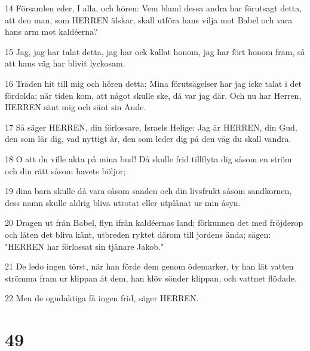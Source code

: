 \par 14 Församlen eder, I alla, och hören: Vem bland dessa andra har förutsagt detta, att den man, som HERREN älskar, skall utföra hans vilja mot Babel och vara hans arm mot kaldéerna?
\par 15 Jag, jag har talat detta, jag har ock kallat honom, jag har fört honom fram, så att hans väg har blivit lyckosam.
\par 16 Träden hit till mig och hören detta; Mina förutsägelser har jag icke talat i det fördolda; när tiden kom, att något skulle ske, då var jag där. Och nu har Herren, HERREN sänt mig och sänt sin Ande.
\par 17 Så säger HERREN, din förlossare, Israels Helige: Jag är HERREN, din Gud, den som lär dig, vad nyttigt är, den som leder dig på den väg du skall vandra.
\par 18 O att du ville akta på mina bud! Då skulle frid tillflyta dig såsom en ström och din rätt såsom havets böljor;
\par 19 dina barn skulle då vara såsom sanden och din livsfrukt såsom sandkornen, dess namn skulle aldrig bliva utrotat eller utplånat ur min åsyn.
\par 20 Dragen ut från Babel, flyn ifrån kaldéernas land; förkunnen det med fröjderop och låten det bliva känt, utbreden ryktet därom till jordens ända; sägen: "HERREN har förlossat sin tjänare Jakob."
\par 21 De ledo ingen törst, när han förde dem genom ödemarker, ty han lät vatten strömma fram ur klippan åt dem, han klöv sönder klippan, och vattnet flödade.
\par 22 Men de ogudaktiga få ingen frid, säger HERREN.

\chapter{49}

